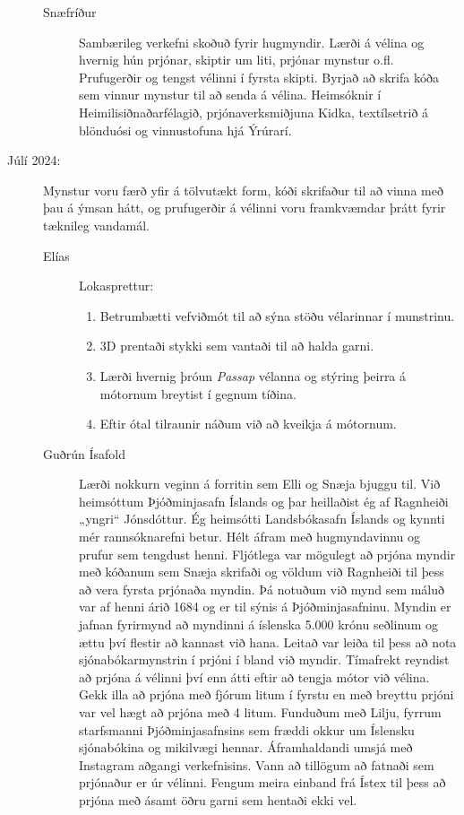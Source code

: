\documentclass[a4paper,12pt,twoside]{article}
\begin{document}
\begin{description}
\begin{description}
        \item[Snæfríður] Sambærileg verkefni skoðuð fyrir hugmyndir. Lærði á vélina og hvernig hún prjónar, skiptir um liti, prjónar mynstur o.fl. Prufugerðir og tengst vélinni í fyrsta skipti. Byrjað að skrifa kóða sem vinnur mynstur til að senda á vélina. Heimsóknir í Heimilisiðnaðarfélagið, prjónaverksmiðjuna Kidka, textílsetrið á blönduósi og vinnustofuna hjá Ýrúrarí.
    \end{description}
    \item[Júlí 2024:]  Mynstur voru færð yfir á tölvutækt form, kóði skrifaður til að vinna með þau á ýmsan hátt, og prufugerðir á vélinni voru framkvæmdar þrátt fyrir tæknileg vandamál.
    \begin{description}
        \item[Elías] Lokasprettur:
        \begin{enumerate}
            \item Betrumbætti vefviðmót til að sýna stöðu vélarinnar í munstrinu.
            \item 3D prentaði stykki sem vantaði til að halda garni.
            \item Lærði hvernig þróun \textit{Passap} vélanna og stýring þeirra á mótornum breytist í gegnum tíðina.
            \item Eftir ótal tilraunir náðum við að kveikja á mótornum.
        \end{enumerate}
        \item[Guðrún Ísafold] Lærði nokkurn veginn á forritin sem Elli og Snæja bjuggu til. Við heimsóttum Þjóðminjasafn Íslands og þar heillaðist ég af Ragnheiði „yngri“ Jónsdóttur. Ég heimsótti Landsbókasafn Íslands og kynnti mér rannsóknarefni betur. Hélt áfram með hugmyndavinnu og prufur sem tengdust henni. Fljótlega var mögulegt að prjóna myndir með kóðanum sem Snæja skrifaði og völdum við Ragnheiði til þess að vera fyrsta prjónaða myndin. Þá notuðum við mynd sem máluð var af henni árið 1684 og er til sýnis á Þjóðminjasafninu. Myndin er jafnan fyrirmynd að myndinni á íslenska 5.000 krónu seðlinum og ættu því flestir að kannast við hana. Leitað var leiða til þess að nota sjónabókarmynstrin í prjóni í bland við myndir. Tímafrekt reyndist að prjóna á vélinni því enn átti eftir að tengja mótor við vélina. Gekk illa að prjóna með fjórum litum í fyrstu en með breyttu prjóni var vel hægt að prjóna með 4 litum. Funduðum með Lilju, fyrrum starfsmanni Þjóðminjasafnsins sem fræddi okkur um Íslensku sjónabókina og mikilvægi hennar. Áframhaldandi umsjá með Instagram aðgangi verkefnisins. Vann að tillögum að fatnaði sem prjónaður er úr vélinni. Fengum meira einband frá Ístex til þess að prjóna með ásamt öðru garni sem hentaði ekki vel.

\end{description}
\end{description}
\end{document}
